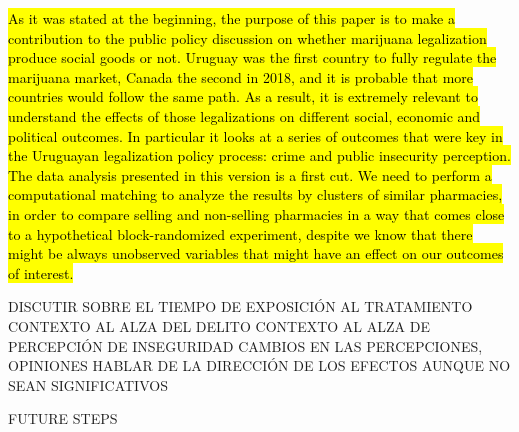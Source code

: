 \documentclass[11pt]{article}
\begin{document}
\hl{As it was stated at the beginning, the purpose of this paper is to make a contribution to the public policy discussion on whether marijuana legalization produce social goods or not. Uruguay was the first country to fully regulate the marijuana market, Canada the second in 2018, and it is probable that more countries would follow the same path. As a result, it is extremely relevant to understand the effects of those legalizations on different social, economic and political outcomes. In particular it looks at a series of outcomes that were key in the Uruguayan legalization policy process: crime and public insecurity perception. The data analysis presented in this version is a first cut. We need to perform a computational matching to analyze the results by clusters of similar pharmacies, in order to compare selling and non-selling pharmacies in a way that comes close to a hypothetical block-randomized experiment, despite we know that there might be always unobserved variables that might have an effect on our outcomes of interest.}


DISCUTIR SOBRE EL TIEMPO DE EXPOSICIÓN AL TRATAMIENTO 
CONTEXTO AL ALZA DEL DELITO
CONTEXTO AL ALZA DE PERCEPCIÓN DE INSEGURIDAD
CAMBIOS EN LAS PERCEPCIONES, OPINIONES
HABLAR DE LA DIRECCIÓN DE LOS EFECTOS AUNQUE NO SEAN SIGNIFICATIVOS

FUTURE STEPS

\printbibliography[title={8 References}]

\newpage
\appendix %
\setcounter{mycounter}{0}\textbf{}
\let\osection\section
\renewcommand{\section}{\stepcounter{mycounter}\osection}
\renewcommand\thesection{Appendix \Alph{mycounter}}
\end{document}
